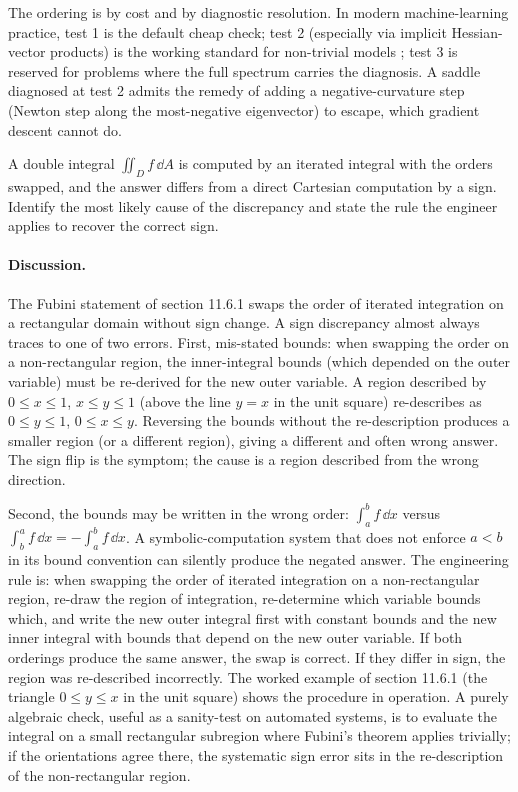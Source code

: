 \begin{exercise}
The ordering is by cost and by diagnostic resolution. In modern
machine-learning practice, test 1 is the default cheap check; test
2 (especially via implicit Hessian-vector products) is the working
standard for non-trivial models \cite{paper:v2c11-yao-hessian-2020};
test 3 is reserved for problems where the full spectrum carries the
diagnosis. A saddle diagnosed at test 2 admits the remedy of adding
a negative-curvature step (Newton step along the most-negative
eigenvector) to escape, which gradient descent cannot do.
\end{exercise}

\begin{exercise}
A double integral $\iint_{D} f \,\dd A$ is computed by an iterated
integral with the orders swapped, and the answer differs from a
direct Cartesian computation by a sign. Identify the most likely
cause of the discrepancy and state the rule the engineer applies
to recover the correct sign.

\paragraph{Discussion.} The Fubini statement of section 11.6.1
swaps the order of iterated integration on a rectangular domain
without sign change. A sign discrepancy almost always traces to one
of two errors. First, mis-stated bounds: when swapping the order on
a non-rectangular region, the inner-integral bounds (which depended
on the outer variable) must be re-derived for the new outer
variable. A region described by $0 \leq x \leq 1$, $x \leq y \leq
1$ (above the line $y = x$ in the unit square) re-describes as
$0 \leq y \leq 1$, $0 \leq x \leq y$. Reversing the bounds without
the re-description produces a smaller region (or a different
region), giving a different and often wrong answer. The sign flip
is the symptom; the cause is a region described from the wrong
direction.

Second, the bounds may be written in the wrong order: $\int_{a}^{b}
f\,\dd x$ versus $\int_{b}^{a} f\,\dd x = -\int_{a}^{b} f\,\dd x$.
A symbolic-computation system that does not enforce $a < b$ in its
bound convention can silently produce the negated answer. The
engineering rule is: when swapping the order of iterated
integration on a non-rectangular region, re-draw the region of
integration, re-determine which variable bounds which, and write
the new outer integral first with constant bounds and the new inner
integral with bounds that depend on the new outer variable. If both
orderings produce the same answer, the swap is correct. If they
differ in sign, the region was re-described incorrectly. The
worked example of section 11.6.1 (the triangle $0 \leq y \leq x$
in the unit square) shows the procedure in operation. A purely
algebraic check, useful as a sanity-test on automated systems, is
to evaluate the integral on a small rectangular subregion where
Fubini's theorem applies trivially; if the orientations agree there,
the systematic sign error sits in the re-description of the
non-rectangular region.
\end{exercise}

